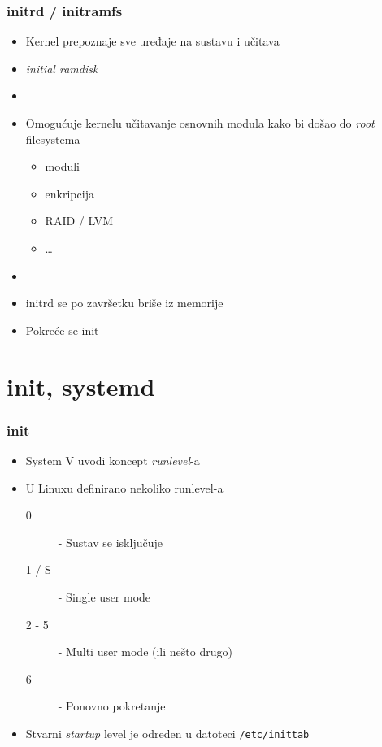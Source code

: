 \documentclass[t]{beamer}
\begin{document}
\begin{frame}
	\frametitle{initrd / initramfs}
	\begin{itemize}
		\item Kernel prepoznaje sve uređaje na sustavu i učitava
		\item[] \emph{initial ramdisk}
		\item[]
		\item Omogućuje kernelu učitavanje osnovnih modula kako bi došao do \emph{root} filesystema
		\begin{itemize}
			\item moduli
			\item enkripcija
			\item RAID / LVM
			\item \dots
		\end{itemize}
		\item[]
		\item initrd se po završetku briše iz memorije
		\item Pokreće se init
	\end{itemize}
\end{frame}

\section{init, systemd}
\begin{frame}
	\frametitle{init}
	\begin{itemize}
		\item System V uvodi koncept \emph{runlevel}-a
	\end{itemize}
	\begin{itemize}
		\item U Linuxu definirano nekoliko runlevel-a
		\begin{description}
			\item[0] - Sustav se isključuje
			\item[1 / S] - Single user mode
			\item[2 - 5] - Multi user mode (ili nešto drugo)
			\item[6] - Ponovno pokretanje
		\end{description}
		\item Stvarni \textit{startup} level je određen u datoteci \texttt{/etc/inittab}
	\end{itemize}
\end{frame}
\end{document}
